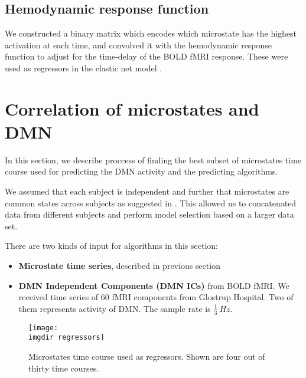 \documentclass{article}
\newcommand{\imgdir}{Images/} %
\begin{document}
\subsection{Hemodynamic response function}   
We constructed a binary matrix which encodes which microstate has the highest activation at each time, and convolved it with the hemodynamic response function to adjust for the time-delay of the BOLD fMRI response. These were used as regressors in the elastic net model \cite{hastie01}. 


\section{Correlation of microstates and DMN}
In this section, we describe proccess of finding the best subset of microstates time course used for predicting the DMN activity and the predicting algorithms.

We assumed that each subject is independent and further that microstates are common states across subjects as suggested in \cite{Yuan20122062}. This allowed us to concatenated data from different subjects and perform model selection based on a larger data set.

There are two kinds of input for algorithms in this section:
\begin{itemize}
\item \textbf{Microstate time series}, described in previous section 
\item \textbf{DMN Independent Components (DMN ICs)} from BOLD fMRI. We received time series of 60 fMRI components from Glostrup Hospital. Two of them represents activity of DMN. The sample rate is $\frac{1}{3}~Hz$. 
\end{itemize} 


\begin{figure}[!ht]
    \centering
    \texttt{[image: \\imgdir regressors]}
    \caption{Microstates time course used as regressors. Shown are four out of thirty time courses.}
    \label{fig:regressors}
\end{figure}
\end{document}

